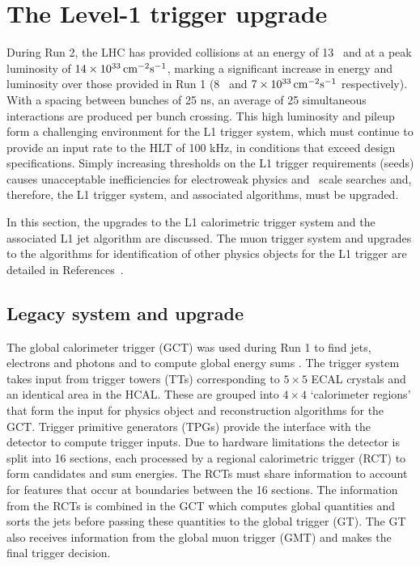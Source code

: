 \chapter{The Level-1 trigger upgrade} %
\label{cha:triggerUpgrade}

During Run 2, the LHC has provided collisions at an energy of 13 \TeV~and at  
a peak luminosity of $14\times10^{33}\,\text{cm}^{-2}\rm{s}^{-1}$, marking a significant increase
in energy and luminosity over those provided in Run 1 (8 \TeV~and $7\times10^{33}\,\text{cm}^{-2}\rm{s}^{-1}$ respectively).
With a spacing between bunches of 25 ns, an average of 25 simultaneous interactions are 
produced per bunch crossing. This high luminosity and pileup form a challenging
environment for the L1 trigger system, which must continue to provide 
an input rate to the HLT of 100 kHz, in conditions that exceed design specifications. 
Simply increasing thresholds on the L1 trigger requirements (seeds) causes
unacceptable inefficiencies for electroweak physics and \TeV~scale searches
and, therefore, the L1 trigger system, and associated algorithms, must be upgraded. 

In this section, the upgrades to the L1 calorimetric trigger system and the 
associated L1 jet algorithm are discussed. The muon trigger system 
and upgrades to the algorithms for identification of other physics objects for 
the L1 trigger are detailed in References~\cite{ele_algo,tau_algo,muon_algo}.


\section{Legacy system and upgrade}

The global calorimeter trigger (GCT) was used during Run 1 to find jets, electrons and photons and to 
compute global energy sums \cite{gct}. The trigger system takes input from trigger towers (TTs) 
corresponding to $5\times5$ ECAL crystals and an identical area in the HCAL. 
These are grouped into $4\times4$ `calorimeter regions' that form the input for physics object and
reconstruction algorithms for the GCT. Trigger primitive generators (TPGs) provide the interface
with the detector to compute trigger inputs. Due to hardware limitations the detector is split into 16 
sections, each processed by a regional calorimetric trigger (RCT) to form candidates and sum 
energies. The RCTs must share information to account for features that occur at boundaries between 
the 16 sections. The information from the RCTs is combined in the GCT which computes global quantities and sorts 
the jets before passing these quantities to the global trigger (GT). The GT also receives information 
from the global muon trigger (GMT) and makes the final trigger decision. 

